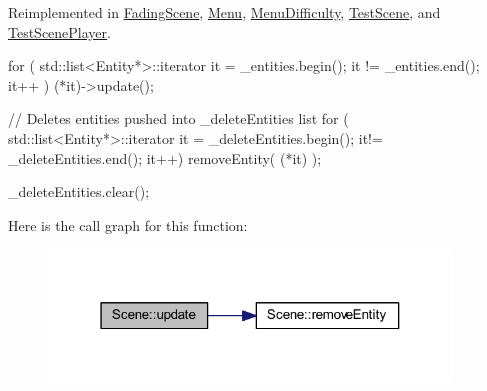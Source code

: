 Reimplemented in \hyperlink{class_fading_scene_a87df73975854a1170eef8b5fadd63b92}{FadingScene}, \hyperlink{class_menu_a8446e8a1e56e9cf1db93790067510a61}{Menu}, \hyperlink{class_menu_difficulty_a59ae5cf3b618e32ac3a009e644123ab4}{MenuDifficulty}, \hyperlink{class_test_scene_a7bfc7a796b5837eb35b03f878d623fe1}{TestScene}, and \hyperlink{class_test_scene_player_a8285c9f16119d8423a0ed4858327097c}{TestScenePlayer}.


\begin{DoxyCode}
{
        for ( std::list<Entity*>::iterator it = _entities.begin(); it != 
      _entities.end(); it++ )
        {
                (*it)->update();
        }

        // Deletes entities pushed into _deleteEntities list
        for ( std::list<Entity*>::iterator it = _deleteEntities.begin(); it!= 
      _deleteEntities.end(); it++)
        {
                removeEntity( (*it) );
        }

        _deleteEntities.clear();
}
\end{DoxyCode}


Here is the call graph for this function:
\nopagebreak
\begin{figure}[H]
\begin{center}
\leavevmode
\includegraphics[width=304pt]{d6/db5/class_scene_aa24c7e636c10e4e42650c1374b90bb80_cgraph}
\end{center}
\end{figure}




